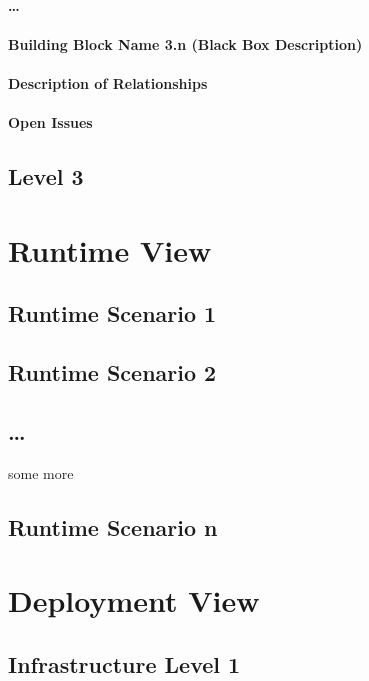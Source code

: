 \documentclass[]{article}
\begin{document}
\paragraph{\ldots{}}

\paragraph{Building Block Name 3.n (Black Box Description)}

\paragraph{Description of Relationships}

\paragraph{Open Issues}

\subsection{Level 3}

\section{Runtime View}

\subsection{Runtime Scenario 1}

\subsection{Runtime Scenario 2}

\subsection{\ldots{}}

some more

\subsection{Runtime Scenario n}

\section{Deployment View}

\subsection{Infrastructure Level 1}
\end{document}
